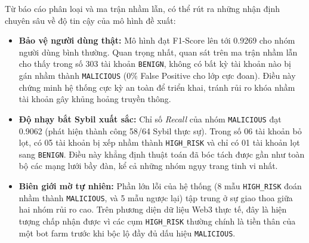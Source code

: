 Từ báo cáo phân loại và ma trận nhầm lẫn, có thể rút ra những nhận định chuyên sâu về độ tin cậy của mô hình đề xuất:
\begin{itemize}[label={--}, itemsep=1pt]
    \item \textbf{Bảo vệ người dùng thật:} Mô hình đạt F1-Score lên tới 0.9269 cho nhóm người dùng bình thường. Quan trọng nhất, quan sát trên ma trận nhầm lẫn cho thấy trong số 303 tài khoản \texttt{BENIGN}, không có bất kỳ tài khoản nào bị gán nhầm thành \texttt{MALICIOUS} ($0\%$ False Positive cho lớp cực đoan). Điều này chứng minh hệ thống cực kỳ an toàn để triển khai, tránh rủi ro khóa nhầm tài khoản gây khủng hoảng truyền thông.
    \item \textbf{Độ nhạy bắt Sybil xuất sắc:} Chỉ số \textit{Recall} của nhóm \texttt{MALICIOUS} đạt 0.9062 (phát hiện thành công 58/64 Sybil thực sự). Trong số 06 tài khoản bỏ lọt, có 05 tài khoản bị xếp nhầm thành \texttt{HIGH\_RISK} và chỉ có 01 tài khoản lọt sang \texttt{BENIGN}. Điều này khẳng định thuật toán đã bóc tách được gần như toàn bộ các mạng lưới bầy đàn, kể cả những nhóm ngụy trang tinh vi nhất.
    \item \textbf{Biên giới mờ tự nhiên:} Phần lớn lỗi của hệ thống (8 mẫu \texttt{HIGH\_RISK} đoán nhầm thành \texttt{MALICIOUS}, và 5 mẫu ngược lại) tập trung ở sự giao thoa giữa hai nhóm rủi ro cao. Trên phương diện dữ liệu Web3 thực tế, đây là hiện tượng chấp nhận được vì các cụm \texttt{HIGH\_RISK} thường chính là tiền thân của một bot farm trước khi bộc lộ đầy đủ dấu hiệu \texttt{MALICIOUS}.
\end{itemize}